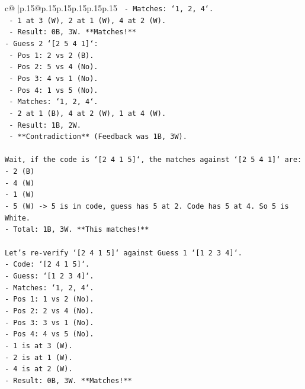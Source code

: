 \documentclass{article}
\begin{document}
{\begin{supertabular}{c@{$\;$}|p{.15\linewidth}@{}p{.15\linewidth}p{.15\linewidth}p{.15\linewidth}p{.15\linewidth}p{.15\linewidth}}
{{{\texttt{    {-} Matches: `1, 2, 4`.} \\
\texttt{    {-} 1 at 3 (W), 2 at 1 (W), 4 at 2 (W).} \\
\texttt{    {-} Result: 0B, 3W. **Matches!**} \\
\texttt{{-} Guess 2 `{[}2 5 4 1{]}`:} \\
\texttt{    {-} Pos 1: 2 vs 2 (B).} \\
\texttt{    {-} Pos 2: 5 vs 4 (No).} \\
\texttt{    {-} Pos 3: 4 vs 1 (No).} \\
\texttt{    {-} Pos 4: 1 vs 5 (No).} \\
\texttt{    {-} Matches: `1, 2, 4`.} \\
\texttt{    {-} 2 at 1 (B), 4 at 2 (W), 1 at 4 (W).} \\
\texttt{    {-} Result: 1B, 2W.} \\
\texttt{    {-} **Contradiction** (Feedback was 1B, 3W).} \\
\\ 
\texttt{Wait, if the code is `{[}2 4 1 5{]}`, the matches against `{[}2 5 4 1{]}` are:} \\
\texttt{{-} 2 (B)} \\
\texttt{{-} 4 (W)} \\
\texttt{{-} 1 (W)} \\
\texttt{{-} 5 (W) {-}> 5 is in code, guess has 5 at 2. Code has 5 at 4. So 5 is White.} \\
\texttt{{-} Total: 1B, 3W. **This matches!**} \\
\\ 
\texttt{Let's re{-}verify `{[}2 4 1 5{]}` against Guess 1 `{[}1 2 3 4{]}`.} \\
\texttt{{-} Code: `{[}2 4 1 5{]}`.} \\
\texttt{{-} Guess: `{[}1 2 3 4{]}`.} \\
\texttt{{-} Matches: `1, 2, 4`.} \\
\texttt{{-} Pos 1: 1 vs 2 (No).} \\
\texttt{{-} Pos 2: 2 vs 4 (No).} \\
\texttt{{-} Pos 3: 3 vs 1 (No).} \\
\texttt{{-} Pos 4: 4 vs 5 (No).} \\
\texttt{{-} 1 is at 3 (W).} \\
\texttt{{-} 2 is at 1 (W).} \\
\texttt{{-} 4 is at 2 (W).} \\
\texttt{{-} Result: 0B, 3W. **Matches!**} \\
\\ 
}}}
\end{supertabular}}
\end{document}
